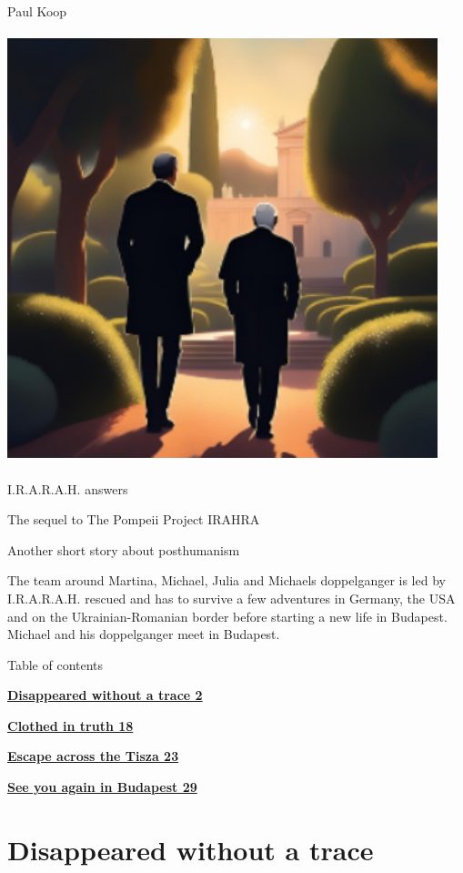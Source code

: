 \documentclass[
]{article}
\author{}
\date{}
\begin{document}
Paul Koop

\includegraphics[width=4.92849in,height=4.92031in]{media/image1.png}

I.R.A.R.A.H. answers

The sequel to The Pompeii Project IRAHRA

Another short story about posthumanism

The team around Martina, Michael, Julia and Michael\textquotesingle s
doppelganger is led by I.R.A.R.A.H. rescued and has to survive a few
adventures in Germany, the USA and on the Ukrainian-Romanian border
before starting a new life in Budapest. Michael and his doppelganger
meet in Budapest.

Table of contents

\hyperref[disappeared-without-a-trace]{\textbf{Disappeared without a
trace 2}}

\hyperref[clothed-in-truth]{\textbf{Clothed in truth 18}}

\hyperref[escape-across-the-tisza]{\textbf{Escape across the Tisza 23}}

\hyperref[see-you-again-in-budapest]{\textbf{See you again in Budapest
29}}

\section{Disappeared without a trace}\label{disappeared-without-a-trace}
\end{document}
